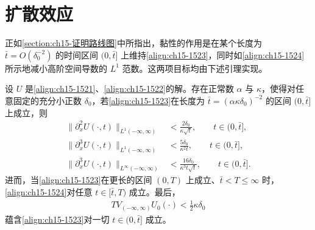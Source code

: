 \documentclass[../../main.tex]{subfiles}
\begin{document}
\section{扩散效应}\label{section:ch15-扩散效应}

正如\cref{section:ch15-证明路线图}中所指出，黏性的作用是在某个长度为 $\bar t=O(\delta_0^{-2})$ 的时间区间 $(0,\bar t]$ 上维持\eqref{align:ch15-1523}，同时如\eqref{align:ch15-1524}所示地减小高阶空间导数的 $L^1$ 范数。这两项目标均由下述引理实现。

\begin{lemma}\label{lemma:ch15-扩散效应估计}
设 $U$ 是\eqref{align:ch15-1521}、\eqref{align:ch15-1522}的解。存在正常数 $\alpha$ 与 $\kappa$，使得对任意固定的充分小正数 $\delta_0$，若\eqref{align:ch15-1523}在长度为 $\bar t=(\alpha\kappa\delta_0)^{-2}$ 的区间 $(0,\bar t]$ 上成立，则
\begin{align}
\|\partial_x^2U(\cdot,t)\|_{L^1(-\infty,\infty)}&<\frac{2\delta_0}{\kappa\sqrt{t}},\qquad t\in(0,\bar t],
\label{align:ch15-1531}\\
\|\partial_x^3U(\cdot,t)\|_{L^1(-\infty,\infty)}&<\frac{5\delta_0}{\kappa^2t},\qquad t\in(0,\bar t],
\label{align:ch15-1532}\\
\|\partial_x^3U(\cdot,t)\|_{L^\infty(-\infty,\infty)}&<\frac{16\delta_0}{\kappa^3t\sqrt{t}},\qquad t\in(0,\bar t].
\label{align:ch15-1533}
\end{align}
进而，当\eqref{align:ch15-1523}在更长的区间 $(0,T)$ 上成立、$\bar t<T\leqslant\infty$ 时，\eqref{align:ch15-1524}对任意 $t\in[\bar t,T)$ 成立。最后，
\begin{align}
TV_{(-\infty,\infty)}U_0(\cdot)<\frac12\kappa\delta_0
\label{align:ch15-1534}
\end{align}
蕴含\eqref{align:ch15-1523}对一切 $t\in(0,\bar t]$ 成立。
\end{lemma}
\end{document}
